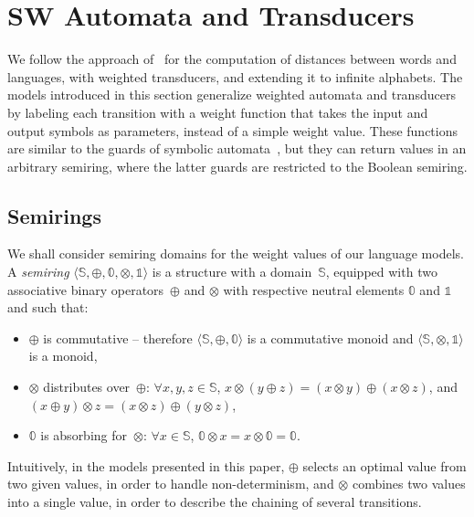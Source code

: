 \documentclass[runningheads]{llncs}
\def\<#1>{\langle #1 \rangle}
\newcommand{\Semiring}{\mathbb{S}}
\newcommand{\zero}{\mathbb{0}}
\newcommand{\one}{\mathbb{1}}
\begin{document}

\section{SW Automata and Transducers}
\label{section:transducer}\label{sec:transducer}
\label{section:SWA}\label{sec:SWA}
\label{section:SWT}\label{sec:SWT}

We follow the approach of~\cite{Mohri03EDWA} for the computation of distances
between words and languages, with weighted transducers, 
and extending it to infinite alphabets.
%
The models introduced in this section generalize 
weighted automata and transducers~\cite{Droste09handbook} 
by labeling each transition with a weight function that takes the 
input and output symbols as parameters, instead of a simple weight value.
These functions are similar to the guards of symbolic automata~\cite{dAntoniVeanes17CAV,dAntoni21CACM},
but they can return values in an arbitrary semiring, 
where the latter guards are restricted to the Boolean semiring.


\subsection{Semirings}
\label{section:semiring}
We shall consider semiring domains for the weight values of our language models.
%
A \emph{semiring} $\< \Semiring, \oplus, \zero, \otimes, \one>$ 
is a structure with a domain~$\Semiring$,
equipped with two associative
binary operators~$\oplus$ and $\otimes$
with respective neutral elements $\zero$ and $\one$ and such that:
\begin{itemize}
\item $\oplus$ is commutative 
-- therefore $\< \Semiring, \oplus, \zero>$ is a commutative monoid 
   and $\< \Semiring, \otimes, \one>$ is a monoid,
\item $\otimes$ distributes over~$\oplus$:  $\forall x, y, z \in \mathbb{S}$,
$x \otimes (y \oplus z) = (x \otimes y) \oplus (x \otimes z)$, 
and $(x \oplus y) \otimes z = (x \otimes z) \oplus (y \otimes z)$,
\item $\zero$ is absorbing for~$\otimes$: 
$\forall x\in \mathbb{S}$, $\zero \otimes x = x \otimes \zero = \zero$.
\end{itemize}
%
Intuitively, in the models presented in this paper, 
$\oplus$ selects an optimal value from two given values, 
in order to handle non-determinism, 
and $\otimes$ combines two values into a single value, 
in order to describe the chaining of several transitions.
\end{document}
